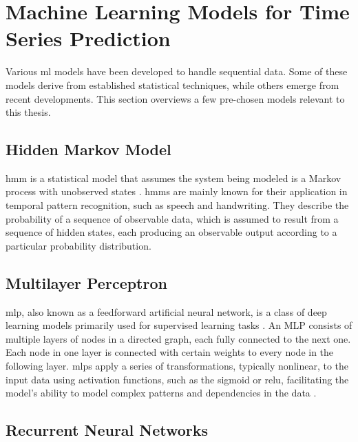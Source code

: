 
\section{Machine Learning Models for Time Series Prediction}

Various \ac{ml} models have been developed to handle sequential data.
Some of these models derive from established statistical techniques, while others emerge from recent developments.
This section overviews a few pre-chosen models relevant to this thesis.

\subsection{Hidden Markov Model}

\ac{hmm} is a statistical model that assumes the system being modeled is a Markov process with unobserved states \cite{hmm-rabiner-1989}.
\acp{hmm} are mainly known for their application in temporal pattern recognition, such as speech and handwriting.
They describe the probability of a sequence of observable data, which is assumed to result from a sequence of hidden states, each producing an observable output according to a particular probability distribution.

\subsection{Multilayer Perceptron}

\ac{mlp}, also known as a feedforward artificial neural network, is a class of deep learning models primarily used for supervised learning tasks \cite{mlp-backpropagation-rumelhart}.
An MLP consists of multiple layers of nodes in a directed graph, each fully connected to the next one.
Each node in one layer is connected with certain weights to every node in the following layer.
\acp{mlp} apply a series of transformations, typically nonlinear, to the input data using activation functions, such as the sigmoid or \ac{relu}, facilitating the model's ability to model complex patterns and dependencies in the data \cite{goodfellow_deep_2016}.

\subsection{Recurrent Neural Networks}

